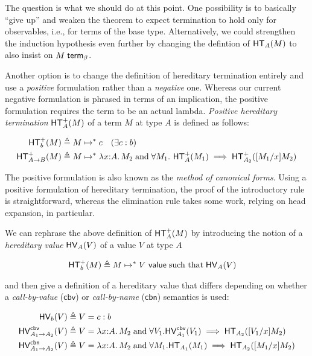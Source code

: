 \documentclass{article}
\begin{document}
The question is what we should do at this point.  One possibility is to basically ``give up''
and weaken the theorem to expect termination to hold only for observables, i.e., for terms of
the base type.  Alternatively, we could strengthen the induction hypothesis even further by
changing the defintion of $\mathsf{HT}_{A}(M)$ to also insist on ${M} \; \mathsf{term}_{\beta}$.

Another option is to change the definition of hereditary termination entirely and use a
\emph{positive} formulation rather than a \emph{negative} one.  Whereas our current negative
formulation is phrased in terms of an implication, the positive formulation requires the term
to be an actual lambda.  \emph{Positive hereditary termination} $\mathsf{HT}^+_{A}(M)$ of a term $M$ at type
$A$ is defined as follows:

\begin{align*}
  \mathsf{HT}^+_{b}(M) &\triangleq M \mapsto^* c \quad (\exists c : b)\\
  \mathsf{HT}^+_{A \to B}(M) &\triangleq M \mapsto^* \lambda x {:} A.\, M_2 \; \text{and}\;
  \forall M_1.\ \mathsf{HT}^+_{A}(M_1) \implies \mathsf{HT}^+_{A_2}([M_1/x]M_2)
\end{align*}

The positive formulation is also known as the \emph{method of canonical forms}.  Using a
positive formulation of hereditary termination, the proof of the introductory rule is
straightforward, whereas the elimination rule takes some work, relying on head expansion, in
particular.

We can rephrase the above definition of $\mathsf{HT}^+_{A}(M)$ by introducing the notion of a
\emph{hereditary value} $\mathsf{HV}_{A}(V)$ of a value $V$ at type $A$

\begin{align*}
  \mathsf{HT}^+_{b}(M) &\triangleq M \mapsto^* V\ \mathsf{value} \;\text{such that}\; \mathsf{HV}_{A}(V)
\end{align*}

\noindent and then give a definition of a hereditary value that differs depending on whether a \emph{call-by-value}
($\mathsf{cbv}$) or \emph{call-by-name} ($\mathsf{cbn}$) semantics is used:

\begin{align*}
\mathsf{HV}_{b}(V) &\triangleq V = c : b \\
\mathsf{HV}^{\mathsf{cbv}}_{A_1 \to A_2}(V) &\triangleq V = \lambda x {:} A.\, M_2 \; \text{and} \; \forall V_1. \mathsf{HV}^{\mathsf{cbv}}_{A_1}(V_1) \implies
\mathsf{HT}_{A_2}([V_1/x]M_2) \\
\mathsf{HV}^{\mathsf{cbn}}_{A_1 \to A_2}(V) &\triangleq V = \lambda x {:} A.\, M_2 \; \text{and} \; \forall M_1. \mathsf{HT}_{A_1}(M_1) \implies
\mathsf{HT}_{A_2}([M_1/x]M_2)
\end{align*}
\end{document}
